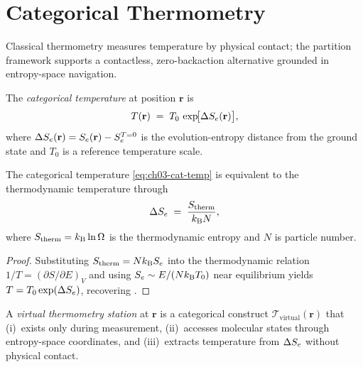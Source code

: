 \section{Categorical Thermometry}
\label{sec:ch03-categorical-therm}

Classical thermometry measures temperature by physical contact; the partition
framework supports a contactless, zero-backaction alternative grounded in
entropy-space navigation.

\begin{definition}
\label{def:ch03-cat-temp}
The \emph{categorical temperature} at position $\mathbf{r}$ is
\begin{equation}
    T(\mathbf{r})
    \;=\;
    T_0\,\exp\!\bigl[\Delta S_e(\mathbf{r})\bigr],
    \label{eq:ch03-cat-temp}
\end{equation}
where $\Delta S_e(\mathbf{r})=S_e(\mathbf{r})-S_e^{T=0}$ is the evolution-entropy
distance from the ground state and $T_0$ is a reference temperature scale.
\end{definition}

\begin{theorem}
\label{thm:ch03-temp-entropy}
The categorical temperature \eqref{eq:ch03-cat-temp} is equivalent to the
thermodynamic temperature through
\begin{equation}
    \Delta S_e \;=\; \frac{S_\mathrm{therm}}{k_{\mathrm{B}} N},
    \label{eq:ch03-temp-entropy}
\end{equation}
where $S_\mathrm{therm}=k_{\mathrm{B}}\ln\Omega$ is the thermodynamic entropy and $N$ is
particle number.
\end{theorem}

\begin{proof}
Substituting $S_\mathrm{therm}=Nk_{\mathrm{B}}S_e$ into the thermodynamic relation
$1/T=(\partial S/\partial E)_V$ and using $S_e\sim E/(Nk_{\mathrm{B}} T_0)$ near
equilibrium yields $T=T_0\exp(\Delta S_e)$, recovering .
\end{proof}

\begin{definition}
\label{def:ch03-virtual-station}
A \emph{virtual thermometry station} at $\mathbf{r}$ is a categorical construct
$\mathcal{T}_\mathrm{virtual}(\mathbf{r})$ that (i)~exists only during
measurement, (ii)~accesses molecular states through entropy-space coordinates,
and (iii)~extracts temperature from $\Delta S_e$ without physical contact.
\end{definition}

